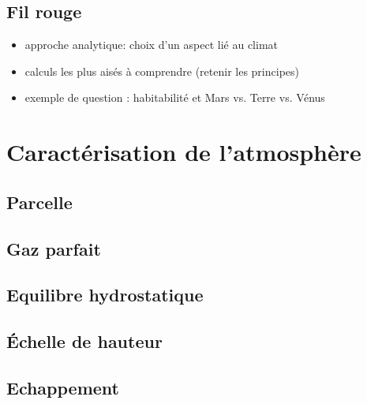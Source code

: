 \documentclass[
        a4paper,
        DIV16,
        10pt,
        cleardoublepage=empty,
        twoside=yes,
        BCOR=8.25mm
        ]{scrbook}
\begin{document}
 \inibook %

\newpage
\section{Fil rouge}
\begin{itemize}
\item approche analytique: choix d'un aspect lié au climat
\item calculs les plus aisés à comprendre (retenir les principes)
\item exemple de question : habitabilité et Mars vs. Terre vs. Vénus
\end{itemize}

\chapter{Caractérisation de l'atmosphère}

\newpage
\section{Parcelle}




\newpage
\section{Gaz parfait}


\newpage
\section{Equilibre hydrostatique}


\newpage
\section{\'Echelle de hauteur}


\newpage
\section{Echappement}


%
\end{document}
